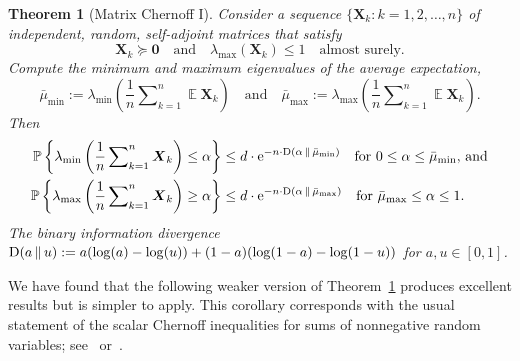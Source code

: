 \documentclass[11pt,letterpaper,twoside,reqno,draft]{amsart}
\newtheorem{thm}{Theorem}
\theoremstyle{remark}
\numberwithin{equation}{section}
\numberwithin{thm}{section}
\begin{document}
\begin{thm}[Matrix Chernoff I] \label{thm:chernoff-full}
Consider a sequence $\{ {\bm{{X}}}_k : k = 1, 2, \dots, n \}$ of independent, random, self-adjoint matrices that satisfy
$$
{\bm{{X}}}_k {\succcurlyeq} {\bm{{0}}}
\quad\text{and}\quad
\lambda_{\max}({\bm{{X}}}_k) \leq 1
\quad\text{almost surely}.
$$
Compute the minimum and maximum eigenvalues of the average expectation,
$$
\bar{\mu}_{\min} := \lambda_{\min}\left( \frac{1}{n}  \sum\nolimits_{k=1}^n {\operatorname{\mathbb{E}}} {\bm{{X}}}_k \right)
\quad\text{and}\quad
\bar{\mu}_{\max} := \lambda_{\max}\left( \frac{1}{n}  \sum\nolimits_{k=1}^n {\operatorname{\mathbb{E}}} {\bm{{X}}}_k \right).
$$
Then
\begin{align*}
{\mathbb{P}\left\{ {{ \lambda_{\min}\left(\frac{1}{n} \sum\nolimits_{k=1}^n {\bm{{X}}}_k \right) \leq \alpha }} \right\}}
	&\leq d \cdot {\mathrm{e}}^{-n \cdot {\rm D}( \alpha \, \Vert \, \bar{\mu}_{\min} )} 
	\quad\text{for $0 \leq \alpha \leq \bar{\mu}_{\min}$, and} \\ 
{\mathbb{P}\left\{ {{ \lambda_{\max}\left(\frac{1}{n} \sum\nolimits_{k=1}^n {\bm{{X}}}_k\right) \geq \alpha }} \right\}}
	&\leq d \cdot {\mathrm{e}}^{-n \cdot {\rm D}( \alpha \, \Vert \, \bar{\mu}_{\max} )}
	\quad\text{for $\bar{\mu}_{\max} \leq \alpha \leq 1$}. 
\end{align*}
The binary information divergence 
${\rm D}( a \, \Vert \, u ) := a(\log(a) - \log(u)) + (1-a)(\log(1-a) - \log(1-u))$
for $a,u \in [0,1]$.
\end{thm}

We have found that the following weaker version of Theorem~\ref{thm:chernoff-full} produces excellent results but is simpler to apply.  This corollary corresponds with the usual statement of the scalar Chernoff inequalities for sums of nonnegative random variables; see~\cite[Exer.~8]{Lug09:Concentration-Measure} or~\cite[\S4.1]{MR95:Randomized-Algorithms}.
\end{document}

